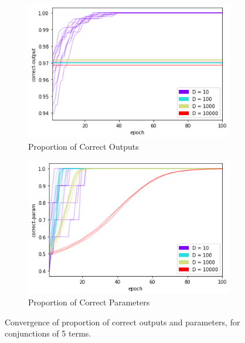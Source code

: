 \begin{figure}[h]
    \centering
    \begin{subfigure}[b]{0.45\textwidth}
        \centering
        \includegraphics[width=\textwidth]{imgs/conj-co-prod-keep50-5t.png}
        \caption{Proportion of Correct Outputs}
        \label{fig:conjconvcorrout}
    \end{subfigure}
    \begin{subfigure}[b]{0.45\textwidth}
        \centering
        \includegraphics[width=\textwidth]{imgs/conj-cp-prod-keep50-5t.png}
        \caption{Proportion of Correct Parameters}
        \label{fig:conjconvcorrparam}
    \end{subfigure}
       \caption{Convergence of proportion of correct outputs and parameters, for conjunctions of 5 terms.}
       \label{fig:conjconvcorr}
\end{figure}

